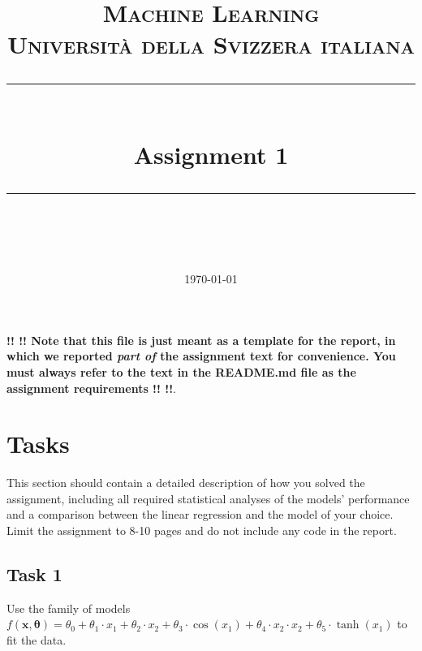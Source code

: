 \documentclass[unicode, 11pt, a4paper]{scrartcl}
\title{	
	\normalfont\normalsize
	\textsc{Machine Learning\\%
	Universit\`a della Svizzera italiana}\\
	\vspace{25pt}
	\rule{\linewidth}{0.5pt}\\
	\vspace{20pt}
	{\huge Assignment 1}\\
	\vspace{12pt}
	\rule{\linewidth}{1pt}\\
	\vspace{12pt}
}
\author{\LARGE \thestudent}
\date{\normalsize\today}
\begin{document}
\maketitle


\noindent \textbf{!! !!  Note that this file is just meant as a template for the report, in which we reported \textit{part of} the assignment text for convenience. You must always refer to the text in the README.md file as the assignment requirements  !! !!}.


\section*{Tasks}

This section should contain a detailed description of how you solved the assignment, including all required statistical analyses of the models' performance and a comparison between the linear regression and the model of your choice. Limit the assignment to 8-10 pages and do not include any code in the report.

\subsection*{Task 1}
Use the family of models $f(\mathbf{x}, \boldsymbol{\theta}) = \theta_0 + \theta_1 \cdot x_1 + \theta_2 \cdot x_2 + \theta_3 \cdot \cos(x_1) + \theta_4 \cdot x_2 \cdot x_2 + \theta_5 \cdot \tanh(x_1)$ to fit the data.


\end{document}
